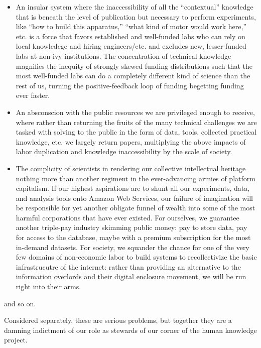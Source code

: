 \documentclass[11pt]{article}
\begin{document}
\begin{multicols}{2}
\begin{itemize}

\item
  An insular system where the inaccessibility of all the ``contextual''
  knowledge \cite{woolKnowledgeNetworksHow2020, barleyBackroomsScienceWork1994}  that is beneath the level of
  publication but necessary to perform experiments, like ``how to build
  this apparatus,'' ``what kind of motor would work here,'' etc. is a
  force that favors established and well-funded labs who can rely on
  local knowledege and hiring engineers/etc. and excludes new,
  lesser-funded labs at non-ivy institutions. The concentration of
  technical knowledge magnifies the inequity of strongly skewed funding
  distributions such that the most well-funded labs can do a completely
  different kind of science than the rest of us, turning the
  positive-feedback loop of funding begetting funding ever faster.
\item
  An absconscion with the public resources we are privileged enough to
  receive, where rather than returning the fruits of the many technical
  challenges we are tasked with solving to the public in the form of
  data, tools, collected practical knowledge, etc. we largely return
  papers, multiplying the above impacts of labor duplication and
  knowledge inaccessibility by the scale of society.
\item
  The complicity of scientists in rendering our collective intellectual
  heritage nothing more than another regiment in the ever-advancing
  armies of platform capitalism. If our highest aspirations are to shunt
  all our experiments, data, and analysis tools onto Amazon Web
  Services, our failure of imagination will be responsible for yet
  another obligate funnel of wealth into some of the most harmful
  corporations that have ever existed. For ourselves, we guarantee
  another triple-pay industry skimming public money: pay to store data,
  pay for access to the database, maybe with a premium subscription for
  the most in-demand datasets. For society, we squander the chance for
  one of the very few domains of non-economic labor to build systems to
  recollectivize the basic infrastrucutre of the internet: rather than
  providing an alternative to the information overlords and their
  digital enclosure movement, we will be run right into their arms.
\end{itemize}

and so on.

Considered separately, these are serious problems, but together they are
a damning indictment of our role as stewards of our corner of the human
knowledge project.


\end{multicols}
\end{document}
